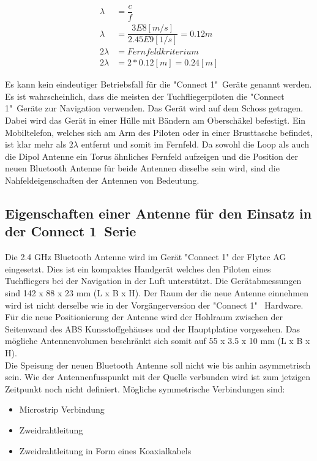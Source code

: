 \begin{eqnarray}\label{eq:Fernfeld}
\lambda &=\dfrac{c}{f} \\
\lambda &=\dfrac{3E8[m/s]}{2.45E9[1/s]}=0.12m\\ 
2\lambda &= Fernfeldkriterium\\ 
2\lambda &= 2*0.12[m] =0.24[m] 
\end{eqnarray}

Es kann kein eindeutiger Betriebsfall für die "Connect 1"\  Geräte genannt werden. Es ist wahrscheinlich, dass die meisten der Tuchfliegerpiloten die "Connect 1"\  Geräte zur Navigation verwenden. Das Gerät wird auf dem Schoss getragen. Dabei wird das Gerät in einer Hülle mit Bändern am Oberschäkel befestigt. Ein Mobiltelefon, welches sich am Arm des Piloten oder in einer Brusttasche befindet, ist klar mehr als $2\lambda$ entfernt und somit im Fernfeld. Da sowohl die Loop als auch die Dipol Antenne ein Torus ähnliches Fernfeld aufzeigen und die Position der neuen Bluetooth Antenne für beide Antennen dieselbe sein wird, sind die Nahfeldeigenschaften der Antennen von Bedeutung.

\subsection{Eigenschaften einer Antenne für den Einsatz in der \glqq Connect 1\grqq \  Serie}\label{sec:EigenschaftenAntenne}
Die 2.4 GHz Bluetooth Antenne wird im Gerät "Connect 1" der Flytec AG eingesetzt. Dies ist ein kompaktes Handgerät welches den Piloten eines Tuchfliegers bei der Navigation in der Luft unterstützt. Die Gerätabmessungen sind 142 x 88 x 23 mm (L x B x H). Der Raum der die neue Antenne einnehmen wird ist nicht derselbe wie in der Vorgängerversion der "Connect 1" \ Hardware. Für die neue Positionierung der Antenne wird der Hohlraum zwischen der Seitenwand des ABS Kunsstoffgehäuses und der Hauptplatine  vorgesehen. Das mögliche Antennenvolumen beschränkt sich somit auf 55 x 3.5 x 10 mm (L x B x H).\\
Die Speisung der neuen Bluetooth Antenne soll nicht wie bis anhin asymmetrisch sein. Wie der Antennenfusspunkt mit der Quelle verbunden wird ist zum jetzigen Zeitpunkt noch nicht definiert. Mögliche symmetrische Verbindungen sind:

\begin{itemize}
\item Microstrip Verbindung  
\item Zweidrahtleitung
\item Zweidrahtleitung in Form eines Koaxialkabels
\end{itemize}

